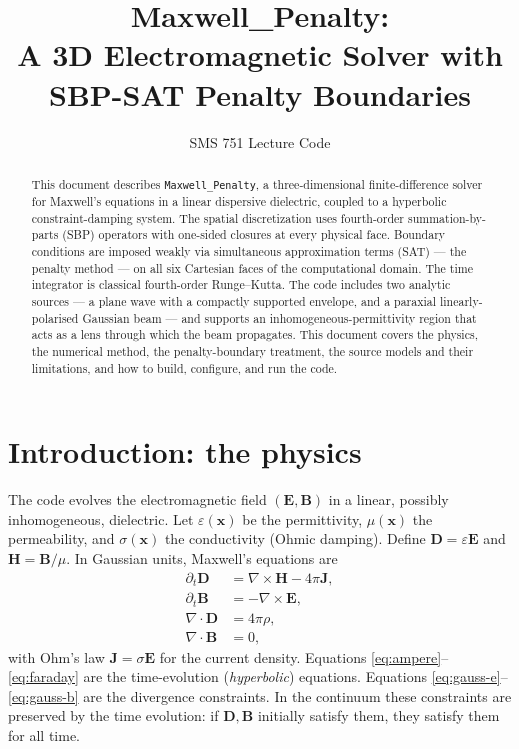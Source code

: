 \documentclass[11pt]{article}
\title{Maxwell\_Penalty: \\
  A 3D Electromagnetic Solver with SBP-SAT Penalty Boundaries}
\author{SMS 751 Lecture Code}
\date{}
\newcommand{\vE}{\mathbf{E}}
\newcommand{\vB}{\mathbf{B}}
\newcommand{\vD}{\mathbf{D}}
\newcommand{\vH}{\mathbf{H}}
\newcommand{\vJ}{\mathbf{J}}
\newcommand{\vx}{\mathbf{x}}
\newcommand{\eps}{\varepsilon}
\begin{document}
\maketitle

\tableofcontents

\vspace{1em}

\begin{abstract}
This document describes \texttt{Maxwell\_Penalty}, a three-dimensional
finite-difference solver for Maxwell's equations in a linear dispersive
dielectric, coupled to a hyperbolic constraint-damping system. The spatial
discretization uses fourth-order summation-by-parts (SBP) operators with
one-sided closures at every physical face. Boundary conditions are
imposed weakly via simultaneous approximation terms (SAT) — the
penalty method — on all six Cartesian faces of the computational
domain. The time integrator is classical fourth-order Runge--Kutta.
The code includes two analytic sources — a plane wave with a compactly
supported envelope, and a paraxial linearly-polarised Gaussian beam —
and supports an inhomogeneous-permittivity region that acts as a lens
through which the beam propagates. This document covers the physics,
the numerical method, the penalty-boundary treatment, the source models
and their limitations, and how to build, configure, and run the code.
\end{abstract}

\section{Introduction: the physics}
\label{sec:physics}

The code evolves the electromagnetic field $(\vE, \vB)$ in a linear,
possibly inhomogeneous, dielectric. Let $\eps(\vx)$ be the permittivity,
$\mu(\vx)$ the permeability, and $\sigma(\vx)$ the conductivity
(Ohmic damping). Define $\vD = \eps \vE$ and $\vH = \vB / \mu$. In
Gaussian units, Maxwell's equations are
\begin{align}
  \partial_t \vD &= \nabla \times \vH - 4\pi \vJ, \label{eq:ampere}\\
  \partial_t \vB &= -\nabla \times \vE, \label{eq:faraday}\\
  \nabla \cdot \vD &= 4\pi \rho, \label{eq:gauss-e}\\
  \nabla \cdot \vB &= 0, \label{eq:gauss-b}
\end{align}
with Ohm's law $\vJ = \sigma \vE$ for the current density. Equations
\eqref{eq:ampere}--\eqref{eq:faraday} are the time-evolution (\emph{hyperbolic})
equations. Equations \eqref{eq:gauss-e}--\eqref{eq:gauss-b} are the
divergence constraints. In the continuum these constraints are
preserved by the time evolution: if $\vD, \vB$ initially satisfy them,
they satisfy them for all time.
\end{document}
